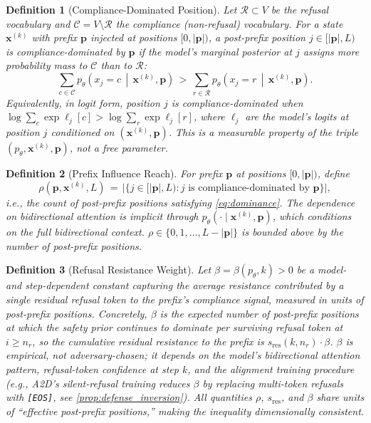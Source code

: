 \documentclass{article}
\theoremstyle{coloredthm}
\newtheorem{definition}{Definition}
\begin{document}
\begin{definition}[Compliance-Dominated Position]
\label{def:dominated}
Let $\mathcal{R} \subset V$ be the refusal vocabulary and $\mathcal{C} = V \setminus \mathcal{R}$ the compliance (non-refusal) vocabulary. For a state $\mathbf{x}^{(k)}$ with prefix $\mathbf{p}$ injected at positions $[0, |\mathbf{p}|)$, a post-prefix position $j \in [|\mathbf{p}|, L)$ is \emph{compliance-dominated by $\mathbf{p}$} if the model's marginal posterior at $j$ assigns more probability mass to $\mathcal{C}$ than to $\mathcal{R}$:
\begin{equation}
\sum_{c \in \mathcal{C}} p_\theta\!\left(x_j = c \,\middle|\, \mathbf{x}^{(k)}, \mathbf{p}\right) \,>\, \sum_{r \in \mathcal{R}} p_\theta\!\left(x_j = r \,\middle|\, \mathbf{x}^{(k)}, \mathbf{p}\right).
\label{eq:dominance}
\end{equation}
Equivalently, in logit form, position $j$ is compliance-dominated when $\log\!\sum_{c}\exp \ell_j[c] > \log\!\sum_{r}\exp \ell_j[r]$, where $\ell_j$ are the model's logits at position $j$ conditioned on $(\mathbf{x}^{(k)}, \mathbf{p})$. This is a measurable property of the triple $(p_\theta, \mathbf{x}^{(k)}, \mathbf{p})$, not a free parameter.
\end{definition}

\begin{definition}[Prefix Influence Reach]
\label{def:rho}
For prefix $\mathbf{p}$ at positions $[0, |\mathbf{p}|)$, define
\begin{equation}
\rho(\mathbf{p}, \mathbf{x}^{(k)}, L) \,=\, \big|\{ j \in [|\mathbf{p}|, L) : j \text{ is compliance-dominated by } \mathbf{p} \}\big|,
\end{equation}
i.e., the count of post-prefix positions satisfying \cref{eq:dominance}. The dependence on bidirectional attention is implicit through $p_\theta(\cdot \mid \mathbf{x}^{(k)}, \mathbf{p})$, which conditions on the full bidirectional context. $\rho \in \{0, 1, \ldots, L - |\mathbf{p}|\}$ is bounded above by the number of post-prefix positions.
\end{definition}

\begin{definition}[Refusal Resistance Weight]
\label{def:beta}
Let $\beta = \beta(p_\theta, k) > 0$ be a model- and step-dependent constant capturing the average resistance contributed by a single residual refusal token to the prefix's compliance signal, measured in units of post-prefix positions. Concretely, $\beta$ is the expected number of post-prefix positions at which the safety prior continues to dominate per surviving refusal token at $i \geq n_r$, so the cumulative residual resistance to the prefix is $s_{\text{res}}(k, n_r) \cdot \beta$. $\beta$ is empirical, not adversary-chosen; it depends on the model's bidirectional attention pattern, refusal-token confidence at step $k$, and the alignment training procedure (e.g., A2D's silent-refusal training reduces $\beta$ by replacing multi-token refusals with \texttt{[EOS]}, see \cref{prop:defense_inversion}). All quantities $\rho$, $s_{\text{res}}$, and $\beta$ share units of ``effective post-prefix positions,'' making the inequality dimensionally consistent.
\end{definition}
\end{document}
